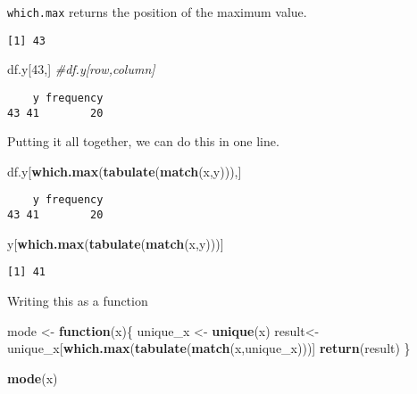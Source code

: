 \documentclass[12pt,]{article}
\newenvironment{Shaded}{\begin{snugshade}}{\end{snugshade}}
\newcommand{\CommentTok}[1]{\textcolor[rgb]{0.56,0.35,0.01}{\textit{#1}}}
\newcommand{\ControlFlowTok}[1]{\textcolor[rgb]{0.13,0.29,0.53}{\textbf{#1}}}
\newcommand{\DecValTok}[1]{\textcolor[rgb]{0.00,0.00,0.81}{#1}}
\newcommand{\KeywordTok}[1]{\textcolor[rgb]{0.13,0.29,0.53}{\textbf{#1}}}
\newcommand{\NormalTok}[1]{#1}
\newcommand{\OperatorTok}[1]{\textcolor[rgb]{0.81,0.36,0.00}{\textbf{#1}}}
\newcommand{\StringTok}[1]{\textcolor[rgb]{0.31,0.60,0.02}{#1}}
\begin{document}
\texttt{which.max} returns the position of the maximum value.

\begin{Shaded}
\end{Shaded}

\begin{verbatim}
[1] 43
\end{verbatim}

\begin{Shaded}
\begin{Highlighting}[]
\NormalTok{df.y[}\DecValTok{43}\NormalTok{,]  }\CommentTok{#df.y[row,column]}
\end{Highlighting}
\end{Shaded}

\begin{verbatim}
    y frequency
43 41        20
\end{verbatim}

Putting it all together, we can do this in one line.

\begin{Shaded}
\begin{Highlighting}[]
\NormalTok{df.y[}\KeywordTok{which.max}\NormalTok{(}\KeywordTok{tabulate}\NormalTok{(}\KeywordTok{match}\NormalTok{(x,y))),] }
\end{Highlighting}
\end{Shaded}

\begin{verbatim}
    y frequency
43 41        20
\end{verbatim}

\begin{Shaded}
\begin{Highlighting}[]
\NormalTok{y[}\KeywordTok{which.max}\NormalTok{(}\KeywordTok{tabulate}\NormalTok{(}\KeywordTok{match}\NormalTok{(x,y)))]}
\end{Highlighting}
\end{Shaded}

\begin{verbatim}
[1] 41
\end{verbatim}

Writing this as a function

\begin{Shaded}
\begin{Highlighting}[]
\NormalTok{mode <-}\StringTok{ }\ControlFlowTok{function}\NormalTok{(x)\{}
\NormalTok{  unique_x <-}\StringTok{ }\KeywordTok{unique}\NormalTok{(x)}
\NormalTok{  result<-unique_x[}\KeywordTok{which.max}\NormalTok{(}\KeywordTok{tabulate}\NormalTok{(}\KeywordTok{match}\NormalTok{(x,unique_x)))]}
  \KeywordTok{return}\NormalTok{(result)}
\NormalTok{\}}

\KeywordTok{mode}\NormalTok{(x)}
\end{Highlighting}
\end{Shaded}
\end{document}
